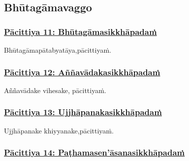 \subsection{Bhūtagāmavaggo}

\subsubsection*{\hyperref[exp11]{Pācittiya 11: Bhūtagāmasikkhāpadaṁ}}
\label{pac11}

Bhūtagāmapātabyatāya,\makeatletter\hyperlink{endnote237-appendix}\makeatother \thinspace pācittiyaṁ.



\subsubsection*{\hyperref[exp12]{Pācittiya 12: Aññavādakasikkhāpadaṁ}}
\label{pac12}

Aññavādake vihesake, pācittiyaṁ.



\subsubsection*{\hyperref[exp13]{Pācittiya 13: Ujjhāpanakasikkhāpadaṁ}}
\label{pac13}

Ujjhāpanake khiyyanake,\makeatletter\hyperlink{endnote238-appendix}\makeatother \thinspace pācittiyaṁ.



\subsubsection*{\hyperref[exp14]{Pācittiya 14: Paṭhamasen'āsanasikkhāpadaṁ}}
\label{pac14}

